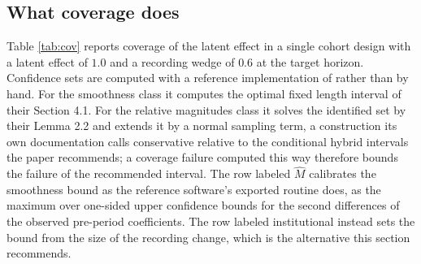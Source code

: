 \documentclass[12pt]{article}
\theoremstyle{definition}
\numberwithin{equation}{section}
\begin{document}
\subsection{What coverage does}

Table \ref{tab:cov} reports coverage of the latent effect in a single cohort
design with a latent effect of $1.0$ and a recording wedge of $0.6$ at the
target horizon. Confidence sets are computed with a reference implementation of
\citet{rambachan2023credible} rather than by hand. For the smoothness class it
computes the optimal fixed length interval of their Section 4.1. For the
relative magnitudes class it solves the identified set by their Lemma 2.2 and
extends it by a normal sampling term, a construction its own documentation calls
conservative relative to the conditional hybrid intervals the paper recommends;
a coverage failure computed this way therefore bounds the failure of the
recommended interval. The row labeled $\widehat M$ calibrates the smoothness
bound as the reference software's exported routine does, as the maximum over
one-sided upper confidence bounds for the second differences of the observed
pre-period coefficients. The row labeled institutional instead sets the bound
from the size of the recording change, which is the alternative this section
recommends.
\end{document}
